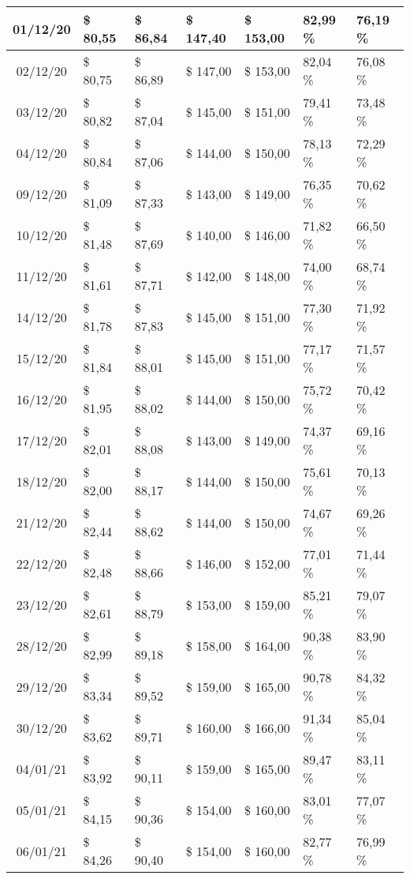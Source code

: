 \begin{center}
\begin{longtable}{|c|p{1.5cm}|p{1.5cm}|p{1.5cm}|p{1.5cm}|p{1.5cm}|p{1.5cm}|}
01/12/20 & \$ 80,55 & \$ 86,84 & \$ 147,40 & \$ 153,00 & 82,99 \% & 76,19 \% \\ \hline
02/12/20 & \$ 80,75 & \$ 86,89 & \$ 147,00 & \$ 153,00 & 82,04 \% & 76,08 \% \\ \hline
03/12/20 & \$ 80,82 & \$ 87,04 & \$ 145,00 & \$ 151,00 & 79,41 \% & 73,48 \% \\ \hline
04/12/20 & \$ 80,84 & \$ 87,06 & \$ 144,00 & \$ 150,00 & 78,13 \% & 72,29 \% \\ \hline
09/12/20 & \$ 81,09 & \$ 87,33 & \$ 143,00 & \$ 149,00 & 76,35 \% & 70,62 \% \\ \hline
10/12/20 & \$ 81,48 & \$ 87,69 & \$ 140,00 & \$ 146,00 & 71,82 \% & 66,50 \% \\ \hline
11/12/20 & \$ 81,61 & \$ 87,71 & \$ 142,00 & \$ 148,00 & 74,00 \% & 68,74 \% \\ \hline
14/12/20 & \$ 81,78 & \$ 87,83 & \$ 145,00 & \$ 151,00 & 77,30 \% & 71,92 \% \\ \hline
15/12/20 & \$ 81,84 & \$ 88,01 & \$ 145,00 & \$ 151,00 & 77,17 \% & 71,57 \% \\ \hline
16/12/20 & \$ 81,95 & \$ 88,02 & \$ 144,00 & \$ 150,00 & 75,72 \% & 70,42 \% \\ \hline
17/12/20 & \$ 82,01 & \$ 88,08 & \$ 143,00 & \$ 149,00 & 74,37 \% & 69,16 \% \\ \hline
18/12/20 & \$ 82,00 & \$ 88,17 & \$ 144,00 & \$ 150,00 & 75,61 \% & 70,13 \% \\ \hline
21/12/20 & \$ 82,44 & \$ 88,62 & \$ 144,00 & \$ 150,00 & 74,67 \% & 69,26 \% \\ \hline
22/12/20 & \$ 82,48 & \$ 88,66 & \$ 146,00 & \$ 152,00 & 77,01 \% & 71,44 \% \\ \hline
23/12/20 & \$ 82,61 & \$ 88,79 & \$ 153,00 & \$ 159,00 & 85,21 \% & 79,07 \% \\ \hline
28/12/20 & \$ 82,99 & \$ 89,18 & \$ 158,00 & \$ 164,00 & 90,38 \% & 83,90 \% \\ \hline
29/12/20 & \$ 83,34 & \$ 89,52 & \$ 159,00 & \$ 165,00 & 90,78 \% & 84,32 \% \\ \hline
30/12/20 & \$ 83,62 & \$ 89,71 & \$ 160,00 & \$ 166,00 & 91,34 \% & 85,04 \% \\ \hline
04/01/21 & \$ 83,92 & \$ 90,11 & \$ 159,00 & \$ 165,00 & 89,47 \% & 83,11 \% \\ \hline
05/01/21 & \$ 84,15 & \$ 90,36 & \$ 154,00 & \$ 160,00 & 83,01 \% & 77,07 \% \\ \hline
06/01/21 & \$ 84,26 & \$ 90,40 & \$ 154,00 & \$ 160,00 & 82,77 \% & 76,99 \% \\ \hline

\end{longtable}
\end{center}

